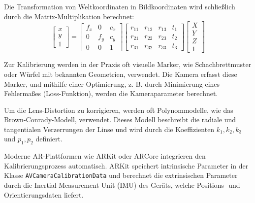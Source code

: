 Die Transformation von Weltkoordinaten in Bildkoordinaten wird schließlich durch die Matrix-Multiplikation berechnet:
\[
\begin{bmatrix}
x \\ y \\ 1
\end{bmatrix}
= 
\begin{bmatrix}
f_x & 0 & c_x \\
0 & f_y & c_y \\
0 & 0 & 1
\end{bmatrix}
\begin{bmatrix}
r_{11} & r_{12} & r_{13} & t_1 \\
r_{21} & r_{22} & r_{23} & t_2 \\
r_{31} & r_{32} & r_{33} & t_3
\end{bmatrix}
\begin{bmatrix}
X \\ Y \\ Z \\ 1
\end{bmatrix}
\]

Zur Kalibrierung werden in der Praxis oft visuelle Marker, wie Schachbrettmuster oder Würfel mit bekannten Geometrien, verwendet. Die Kamera erfasst diese Marker, und mithilfe einer Optimierung, z. B. durch Minimierung eines Fehlermaßes (Loss-Funktion), werden die Kameraparameter berechnet.

Um die Lens-Distortion zu korrigieren, werden oft Polynommodelle, wie das Brown-Conrady-Modell, verwendet. Dieses Modell beschreibt die radiale und tangentialen Verzerrungen der Linse und wird durch die Koeffizienten \( k_1, k_2, k_3 \) und \( p_1, p_2 \) definiert.

Moderne AR-Plattformen wie ARKit oder ARCore integrieren den Kalibrierungsprozess automatisch. ARKit speichert intrinsische Parameter in der Klasse \texttt{AVCameraCalibrationData} und berechnet die extrinsischen Parameter durch die Inertial Measurement Unit (IMU) des Geräts, welche Positions- und Orientierungsdaten liefert.

